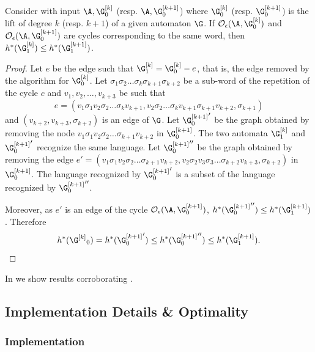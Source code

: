 \documentclass[11pt,twoside,a4paper,openright]{uclouvain-thesis}
\newcommand{\Deb}[1][k]{\G^{[#1]}}
\newcommand{\LangAutom}[1][\G]{{#1}^*}
\newcommand{\Oracle}{\mathcal{O}}
\begin{document}
\begin{mytheo}\label{theo:remove_1_cycle}
  Consider  with input $\A, \Deb_0$ (resp. $\A, \Deb[k+1]_0$) where $\Deb_0$ (resp. $\Deb[k+1]_0$) is the lift of degree $k$ (resp. $k+1$) of a given automaton $\G$.
  If $\Oracle_\epsilon(\A, \Deb[k]_0)$ and $\Oracle_\epsilon(\A, \Deb[k+1]_0)$ are cycles corresponding to the same word,
  then $\LangAutom[h](\Deb_1) \leq \LangAutom[h](\Deb[k+1]_1)$.

  \begin{proof}
    Let $e$ be the edge such that $\Deb_1 = \Deb_0 - e$, that is, the edge removed by the algorithm for $\Deb_0$.
    Let $\sigma_{1}\sigma_{2}\ldots\sigma_{k}\sigma_{k+1}\sigma_{k+2}$ be a sub-word of the repetition of the cycle $c$
    and $v_1, v_2, \ldots, v_{k+3}$ be such that
    $$e = (v_1\sigma_{1}v_2\sigma_{2} \ldots \sigma_{k}v_{k+1}, v_2\sigma_{2} \ldots \sigma_{k} v_{k+1}\sigma_{k+1}v_{k+2}, \sigma_{k+1})$$
    and $(v_{k+2}, v_{k+3}, \sigma_{k+2})$ is an edge of $\G$.
    Let ${\Deb[k+1]_0}'$ be the graph obtained by removing the node $v_1\sigma_{1}v_2\sigma_{2} \ldots \sigma_{k+1}v_{k+2}$ in $\Deb[k+1]_0$.
    The two automata ${\Deb_1}$ and ${\Deb[k+1]_0}'$ recognize the same language.
    Let ${\Deb[k+1]_0}''$ be the graph obtained by removing the edge $e' = (v_1\sigma_{1}v_2\sigma_{2} \ldots \sigma_{k+1}v_{k+2}, v_2\sigma_{2}v_3\sigma_{3} \ldots \sigma_{k+2}v_{k+3}, \sigma_{k+2})$ in $\Deb[k+1]_0$.
    The language recognized by ${\Deb[k+1]_0}'$ is a subset of the language recognized by ${\Deb[k+1]_0}''$.

    Moreover, as $e'$ is an edge of the cycle $\Oracle_\epsilon(\A, \Deb[k+1]_0)$,
    $\LangAutom[h]({\Deb[k+1]_0}'') \leq \LangAutom[h](\Deb[k+1]_1)$.
    Therefore
    \[
      \LangAutom[h]({\Deb}_0) = \LangAutom[h]({\Deb[k+1]_0}') \leq \LangAutom[h]({\Deb[k+1]_0}'') \leq \LangAutom[h](\Deb[k+1]_1).
    \]
  \end{proof}
\end{mytheo}

In  we show results corroborating .

\subsection{Implementation Details \& Optimality}
\label{sec:impl_opt}

\subsubsection{Implementation}
\end{document}
